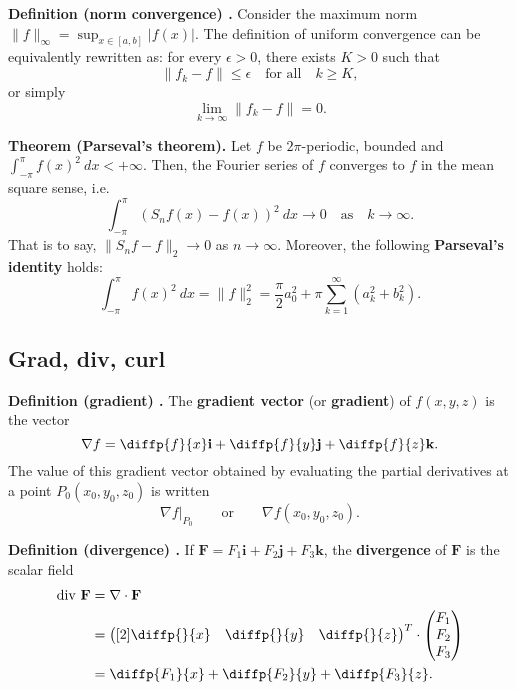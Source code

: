 \begin{shaded}
\textbf{Definition (norm convergence) \cite{math2111_notes}.} Consider the maximum norm $\lVert f \rVert_\infty = \sup_{x \in [a, b]} |f(x)|$. The definition of uniform convergence can be equivalently rewritten as: for every $\epsilon > 0$, there exists $K > 0$ such that
$$ \lVert f_k - f \rVert \leq \epsilon \quad \text{for all} \quad k \geq K , $$
or simply
$$ \lim_{k \to \infty} \lVert f_k - f \rVert = 0 . $$
\end{shaded}

\begin{shaded}
\textbf{Theorem (Parseval's theorem).} Let $f$ be $2 \pi$-periodic, bounded and $\int_{-\pi}^\pi f(x)^2 \ dx < + \infty$. Then, the Fourier series of $f$ converges to $f$ in the mean square sense, i.e.
$$ \int_{- \pi}^\pi (S_n f(x) - f(x))^2 \ dx \to 0 \quad \text{as} \quad k \to \infty . $$
That is to say, $\lVert S_n f - f \rVert_2 \to 0$ as $n \to \infty$. Moreover, the following \textbf{Parseval's identity} holds:
$$ \int_{-\pi}^\pi f(x)^2 \ dx = \lVert f \rVert_2^2 = \frac{\pi}{2} a_0^2 + \pi \sum_{k = 1}^{\infty} (a_k^2 + b_k^2) . $$
\end{shaded}

\subsection{Grad, div, curl}

\begin{shaded}
\textbf{Definition (gradient) \cite{thomas_calculus}.} The \textbf{gradient vector} (or \textbf{gradient}) of $f(x, y, z)$ is the vector
$$ \nabla f = \diffp{f}{x} \mathbf{i} + \diffp{f}{y} \mathbf{j} + \diffp{f}{z} \mathbf{k} . $$
The value of this gradient vector obtained by evaluating the partial derivatives at a point $P_0(x_0, y_0, z_0)$ is written
$$ \nabla f |_{P_0} \qquad \text{or} \qquad \nabla f(x_0, y_0, z_0) . $$
\end{shaded}

\begin{shaded}
\textbf{Definition (divergence) \cite{math2111_notes}.} If $\mathbf{F} = F_1 \mathbf{i} + F_2 \mathbf{j} + F_3 \mathbf{k}$, the \textbf{divergence} of $\mathbf{F}$ is the scalar field
\begin{align*}
\text{div} \ \mathbf{F} &= \nabla \cdot \mathbf{F} \\
&= \begin{pmatrix}[2] \diffp{}{x} & \diffp{}{y} & \diffp{}{z} \end{pmatrix}^{T}
\cdot \begin{pmatrix} F_1 \\ F_2 \\ F_3 \end{pmatrix} \\
&= \diffp{F_1}{x} + \diffp{F_2}{y} + \diffp{F_3}{z} .
\end{align*}
\end{shaded}

